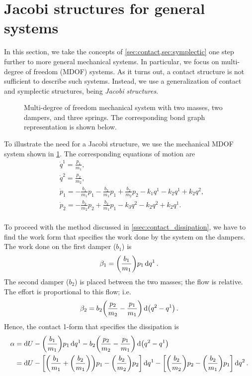 \section{Jacobi structures for general systems}
\label{sec:jacobi}
In this section, we take the concepts of \cref{sec:contact,sec:symplectic} one step further to more general mechanical systems. In particular, we focus on multi-degree of freedom (MDOF) systems. As it turns out, a contact structure is not sufficient to describe such systems. Instead, we use a generalization of contact and symplectic structures, being \emph{Jacobi structures}.

\begin{figure}[ht!]
    \centering
    
    \caption{Multi-degree of freedom mechanical system with two masses, two dampers, and three springs. The corresponding bond graph representation is shown below.}
    \label{fig:mdof_oscillator}
\end{figure}

To illustrate the need for a Jacobi structure, we use the mechanical MDOF system shown in \cref{fig:mdof_oscillator}. The corresponding equations of motion are
\begin{equation}
    \begin{split}
        &\dot{q}^1 = \frac{p_1}{m_1}, \\
        &\dot{q}^2 = \frac{p_2}{m_2}, \\
        &\dot{p}_1 = -\frac{b_1}{m_1}p_1 - \frac{b_2}{m_1}p_1 + \frac{b_2}{m_2}p_2 - k_1 q^1 - k_2 q^1 + k_2 q^2, \\
        &\dot{p}_2 =  - \frac{b_2}{m_2}p_2 + \frac{b_2}{m_1}p_1 - k_3 q^2 - k_2 q^2 + k_2 q^1. \\
    \end{split}
\end{equation}

To proceed with the method discussed in \cref{ssec:contact_dissipation}, we have to find the work form that specifies the work done by the system on the dampers. The work done on the first damper (\(b_1\)) is
\begin{equation}
     \beta_1 = \qty(\frac{b_1}{m_1})p_1\dd{q^1}.
\end{equation}
The second damper (\(b_2\)) is placed between the two masses; the flow is relative. The effort is proportional to this flow; i.e.
\begin{equation}
     \beta_2 = b_2\qty(\frac{p_2}{m_2} - \frac{p_1}{m_1})\dd{\qty(q^2 - q^1)}.
\end{equation}
Hence, the contact 1-form that specifies the dissipation is
\begin{equation}
    \begin{split}
        \alpha  &= \dd{U} - \qty(\frac{b_1}{m_1})p_1\dd{q^1} - b_2\qty(\frac{p_2}{m_2} - \frac{p_1}{m_1})\dd{\qty(q^2 - q^1)} \\
                &= \dd{U} - \qty[\qty(\frac{b_1}{m_1} + \qty(\frac{b_2}{m_1})) p_1 - \qty(\frac{b_2}{m_2})p_2]\dd{q^1}
                          - \qty[\qty(\frac{b_2}{m_2})p_2 - \qty(\frac{b_2}{m_1})p_1]\dd{q^2}.
    \end{split}
    \label{eq:mdof_form}
\end{equation}

